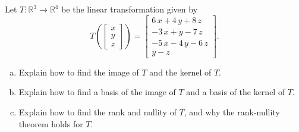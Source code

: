 
\begin{exerciseStatement}
 Let \(T:\mathbb{R}^ 3  \to \mathbb{R}^ 4 \) be the linear transformation given by \[T\left(  \left[\begin{array}{c}
x \\
y \\
z
\end{array}\right]  \right) =  \left[\begin{array}{c}
6 \, x + 4 \, y + 8 \, z \\
-3 \, x + y - 7 \, z \\
-5 \, x - 4 \, y - 6 \, z \\
y - z
\end{array}\right] .\]
\begin{enumerate}[(a)]
\item Explain how to find the image of \(T\) and the kernel of \(T\).
\item Explain how to find a basis of the image of \(T\) and a basis of the kernel of \(T\).
\item Explain how to find the rank and nullity of \(T\), and why the rank-nullity theorem holds for \(T\).
\end{enumerate}
    
\end{exerciseStatement}
    
